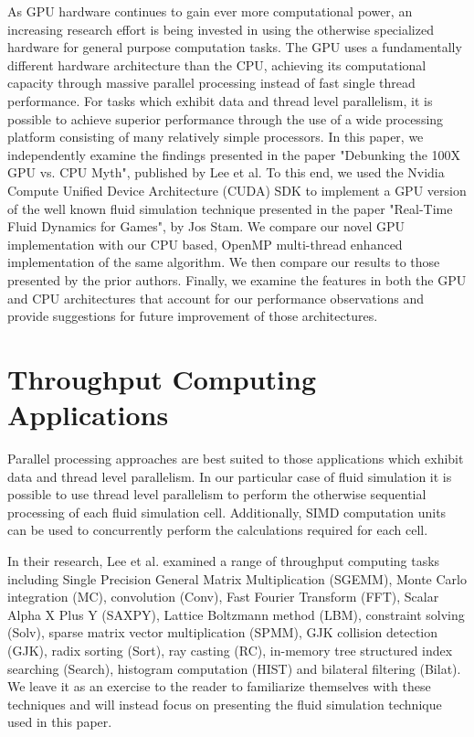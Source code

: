 \documentclass[conference]{IEEEtran}
\begin{document}
As GPU hardware continues to gain ever more computational power, an increasing research effort is being invested in using the otherwise specialized hardware for general purpose computation tasks. The GPU uses a fundamentally different hardware architecture than the CPU, achieving its computational capacity through massive parallel processing instead of fast single thread performance. For tasks which exhibit data and thread level parallelism, it is possible to achieve superior performance through the use of a wide processing platform consisting of many relatively simple processors. In this paper, we independently examine the findings presented in the paper "Debunking the 100X GPU vs. CPU Myth", published by Lee et al.\cite{Lee:2010:DGV:1816038.1816021} To this end, we used the Nvidia Compute Unified Device Architecture (CUDA) SDK to implement a GPU version of the well known fluid simulation technique presented in the paper "Real-Time Fluid Dynamics for Games",  by Jos Stam.\cite{Stam:2003} We compare our novel GPU implementation with our CPU based, OpenMP multi-thread enhanced implementation of the same algorithm. We then compare our results to those presented by the prior authors. Finally, we examine the features in both the GPU and CPU architectures that account for our performance observations and provide suggestions for future improvement of those architectures. 

\section{Throughput Computing Applications}

Parallel processing approaches are best suited to those applications which exhibit data and thread level parallelism. In our particular case of fluid simulation it is possible to use thread level parallelism to perform the otherwise sequential processing of each fluid simulation cell. Additionally, SIMD computation units can be used to concurrently perform the calculations required for each cell. 

In their research, Lee et al. examined a range of throughput computing tasks including Single Precision General Matrix Multiplication (SGEMM), Monte Carlo integration (MC), convolution (Conv), Fast Fourier Transform (FFT), Scalar Alpha X Plus Y (SAXPY), Lattice Boltzmann method (LBM), constraint solving (Solv), sparse matrix vector multiplication (SPMM), GJK collision detection (GJK), radix sorting (Sort), ray casting (RC), in-memory tree structured index searching (Search), histogram computation (HIST) and bilateral filtering (Bilat). We leave it as an exercise to the reader to familiarize themselves with these techniques and will instead focus on presenting the fluid simulation technique used in this paper.\cite{Asanovic:2006}\cite{Bienia:2008}\cite{Chen:2008}\cite{IMPACT}
\end{document}
